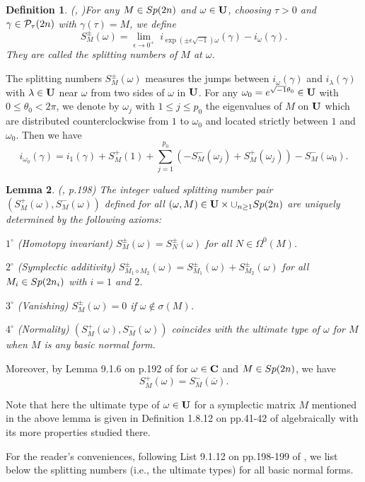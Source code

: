 \documentclass[11pt]{article}
\newtheorem{lemma}{Lemma}[section]
\newtheorem{definition}[lemma]{Definition}
\def\be{\begin{equation}}
\def\ee{\end{equation}}
\def\lb{\label}
\def\C{{\bf C}}
\def\U{{\bf U}}
\def\ga{{\gamma}}
\def\th{{\theta}}
\def\om{{\omega}}
\def\P{{\cal P}}
\def\Sp{{\rm Sp}}
\begin{document}
\begin{definition} (\cite{Lon2}, \cite{Lon4})\lb{D2.3}
For any $M\in\Sp(2n)$ and $\om\in\U$, choosing $\tau>0$ and $\ga\in\P_\tau(2n)$ with $\ga(\tau)=M$,
we define
\be
S_M^{\pm}(\om)=\lim_{\epsilon\rightarrow0^+}\;i_{\exp(\pm\epsilon\sqrt{-1})\om}(\ga)-i_\om(\ga).
\ee
They are called the splitting numbers of $M$ at $\om$.
\end{definition}
The splitting numbers $S_M^{\pm}(\om)$ measures the jumps between $i_\om(\ga)$
and $i_\lambda(\ga)$ with $\lambda\in\U$ near $\om$ from two sides of $\om$ in $\U$.
For any $\om_0=e^{\sqrt{-1}\th_0}\in\U$ with $0\le\th_0<2\pi$,
we denote by $\om_j$ with $1\le j\le p_0$ the eigenvalues of $M$ on $\U$ which are
distributed counterclockwise from $1$ to $\om_0$ and located strictly between $1$ and $\om_0$.
Then we have
\be i_{\om_0}(\ga)=i_1(\ga)+S_M^+(1)+\sum_{j=1}^{p_0}(-S_M^-(\om_j)+S_M^+(\om_j))-S_M^-(\om_0).  \lb{5.A1}\ee

\begin{lemma} (\cite{Lon4}, p.198)
The integer valued splitting number pair $(S_M^+(\om),S_M^-(\om))$ defined for all
$(\om,M)\in\U\times\cup_{n\ge1}\Sp(2n)$ are uniquely determined by the following axioms:

$1^{\circ}$ (Homotopy invariant) $S_M^{\pm}(\om)=S_N^{\pm}(\om)$ for all $N\in\Omega^0(M)$.

$2^{\circ}$ (Symplectic additivity) $S_{M_1\diamond M_2}^{\pm}(\om)=S_{M_1}^{\pm}(\om)+S_{M_2}^{\pm}(\om)$
for all $M_i\in\Sp(2n_i)$ with $i=1$ and $2$.

$3^{\circ}$ (Vanishing) $S_M^{\pm}(\om)=0$ if $\om\not\in\sigma(M)$.

$4^{\circ}$ (Normality) $(S_M^+(\om),S_M^-(\om))$ coincides with the ultimate type of
$\om$ for $M$ when $M$ is any basic normal form.
\end{lemma}

Moreover, by Lemma 9.1.6 on p.192 of \cite{Lon4} for $\om\in\C$ and $M\in\Sp(2n)$, we have
\be  S_M^+(\om)=S_M^-(\overline\om).  \ee

Note that here the ultimate type of $\om\in\U$ for a symplectic matrix $M$ mentioned in the above lemma
is given in Definition 1.8.12 on pp.41-42 of \cite{Lon4} algebraically with its more properties studied
there.

For the reader's conveniences, following List 9.1.12 on pp.198-199 of \cite{Lon4}, we list below
the splitting numbers (i.e., the ultimate types) for all basic normal forms.
\end{document}
